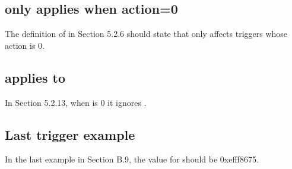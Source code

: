 \documentclass[twoside,11pt]{article}
\begin{document}
\subsection{\Fmte only applies when action=0}

The definition of \Fmte in Section 5.2.6 should state that \Fmte only affects
triggers whose action is 0.

\subsection{\Fsselect applies to \Fsvalue}

In Section 5.2.13, when \Fsselect is 0 it ignores \Fsvalue.

\subsection{Last trigger example}

In the last example in Section B.9, the value for  should be
0xefff8675.
\end{document}

